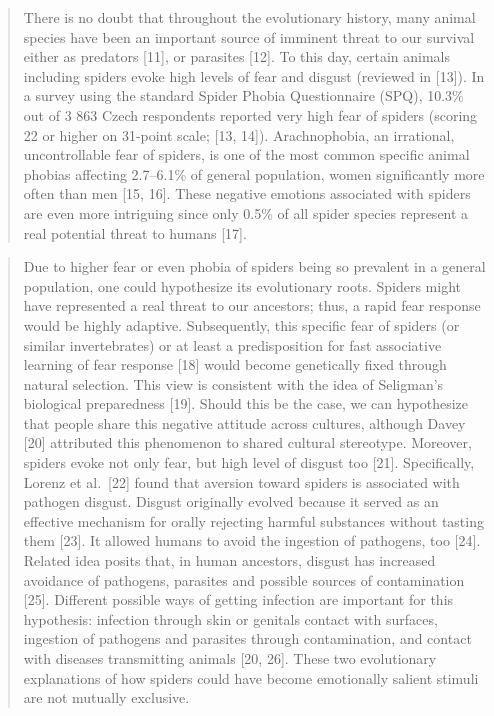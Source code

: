 \documentclass[
]{book}
\begin{document}
\begin{quote}
There is no doubt that throughout the evolutionary history, many animal species have been an important source of imminent threat to our survival either as predators {[}11{]}, or parasites {[}12{]}. To this day, certain animals including spiders evoke high levels of fear and disgust (reviewed in {[}13{]}). In a survey using the standard Spider Phobia Questionnaire (SPQ), 10.3\% out of 3 863 Czech respondents reported very high fear of spiders (scoring 22 or higher on 31-point scale; {[}13, 14{]}). Arachnophobia, an irrational, uncontrollable fear of spiders, is one of the most common specific animal phobias affecting 2.7--6.1\% of general population, women significantly more often than men {[}15, 16{]}. These negative emotions associated with spiders are even more intriguing since only 0.5\% of all spider species represent a real potential threat to humans {[}17{]}.
\end{quote}

\begin{quote}
Due to higher fear or even phobia of spiders being so prevalent in a general population, one could hypothesize its evolutionary roots. Spiders might have represented a real threat to our ancestors; thus, a rapid fear response would be highly adaptive. Subsequently, this specific fear of spiders (or similar invertebrates) or at least a predisposition for fast associative learning of fear response {[}18{]} would become genetically fixed through natural selection. This view is consistent with the idea of Seligman's biological preparedness {[}19{]}. Should this be the case, we can hypothesize that people share this negative attitude across cultures, although Davey {[}20{]} attributed this phenomenon to shared cultural stereotype. Moreover, spiders evoke not only fear, but high level of disgust too {[}21{]}. Specifically, Lorenz et al.~{[}22{]} found that aversion toward spiders is associated with pathogen disgust. Disgust originally evolved because it served as an effective mechanism for orally rejecting harmful substances without tasting them {[}23{]}. It allowed humans to avoid the ingestion of pathogens, too {[}24{]}. Related idea posits that, in human ancestors, disgust has increased avoidance of pathogens, parasites and possible sources of contamination {[}25{]}. Different possible ways of getting infection are important for this hypothesis: infection through skin or genitals contact with surfaces, ingestion of pathogens and parasites through contamination, and contact with diseases transmitting animals {[}20, 26{]}. These two evolutionary explanations of how spiders could have become emotionally salient stimuli are not mutually exclusive.
\end{quote}
\end{document}
